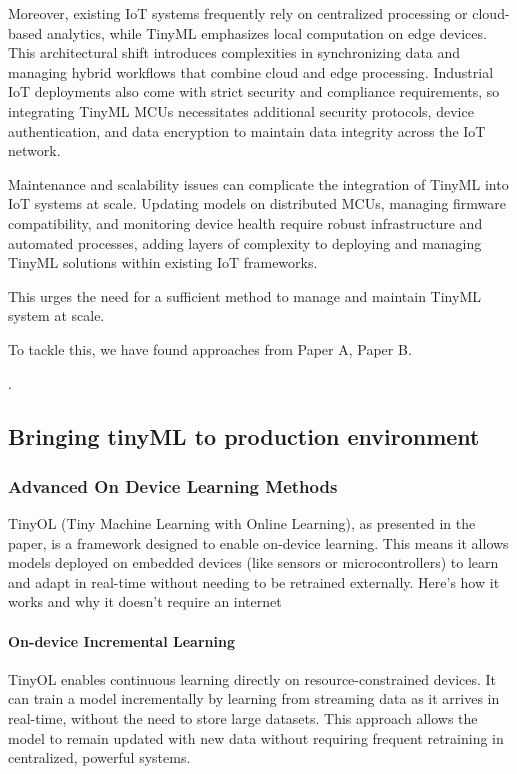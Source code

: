 \documentclass[twocolumn]{article}
\begin{document}
Moreover, existing IoT systems frequently rely on centralized processing or cloud-based analytics, while TinyML emphasizes local computation on edge devices. This architectural shift introduces complexities in synchronizing data and managing hybrid workflows that combine cloud and edge processing. Industrial IoT deployments also come with strict security and compliance requirements, so integrating TinyML MCUs necessitates additional security protocols, device authentication, and data encryption to maintain data integrity across the IoT network.

Maintenance and scalability issues can complicate the integration of TinyML into IoT systems at scale. Updating models on distributed MCUs, managing firmware compatibility, and monitoring device health require robust infrastructure and automated processes, adding layers of complexity to deploying and managing TinyML solutions within existing IoT frameworks.

This urges the need for a sufficient method to manage and maintain TinyML system at scale.

To tackle this, we have found approaches from Paper A, Paper B.

\cite{hussein_original_2024, paul_rethinking_2021, de_prado_robustifying_2020,ren_synergy_2021,roshan_adaptive_2021}.


\subsection{Bringing tinyML to production environment}
\subsubsection{Advanced On Device Learning Methods }
TinyOL (Tiny Machine Learning with Online Learning), as presented in the paper, is a framework designed to enable on-device learning. This means it allows models deployed on embedded devices (like sensors or microcontrollers) to learn and adapt in real-time without needing to be retrained externally. Here’s how it works and why it doesn’t require an internet 
\paragraph{On-device Incremental Learning} TinyOL enables continuous learning directly on resource-constrained devices. It can train a model incrementally by learning from streaming data as it arrives in real-time, without the need to store large datasets. This approach allows the model to remain updated with new data without requiring frequent retraining in centralized, powerful systems.
\end{document}
